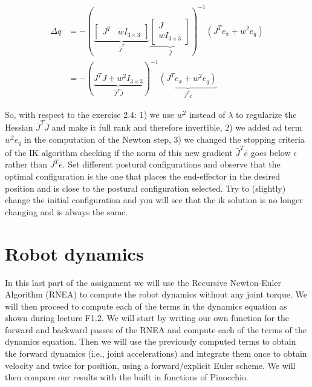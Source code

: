 \documentclass[11pt]{article}
\newcommand{\mat}[1]{\ensuremath{\begin{bmatrix}#1\end{bmatrix}}}	%
\begin{document}
\begin{align*}
\Delta q &= -\left( \underbrace{ \mat { J^T &  wI_{3 \times 3} }}_{\bar{J}^T} \underbrace{ \mat{J  \\ wI_{3 \times 3}}}_{\bar{J}} \right)^{-1} \left(J^T e_x + w^2e_q \right) \\
&= -\left(\underbrace{  J^TJ + w^2I_{3 \times 3}}_{\bar{J}^T\bar{J}} \right)^{-1} \underbrace{ \left(J^T e_x + w^2 e_q \right) }_{\bar{J}^T\bar{e}}
\end{align*}


So, with respect to the exercise 2.4: 1) we use $w^2$ instead of $\lambda $ to regularize the Hessian $\bar{J}^T\bar{J}$ and make it full rank and therefore invertible, 2) we added ad term $w^2 e_q $ in the computation of the Newton step, 3) we changed the stopping criteria of the IK algorithm checking if the norm of this new gradient $\bar{J}^T\bar{e}$ goes below $\epsilon$ rather than  $J^T\bar{e}$.
Set different postural configurations and observe that the optimal configuration is the one that places the end-effector in the desired position and is close to the postural  configuration selected. Try to (slightly) change the initial configuration and you will see that the ik solution is no longer changing and is always the same. 
\\

\section{Robot dynamics}

In this last part of the assignment we will use the Recursive Newton-Euler Algorithm (RNEA) to compute the robot dynamics without any joint torque. We will then proceed to compute each of the terms in the dynamics equation as shown during lecture F1.2.  We will start by writing our own function for the forward and backward passes of the RNEA and compute each of the terms of the dynamics equation. Then we will use the previously computed terms to obtain the forward dynamics (i.e., joint accelerations) and integrate them once to obtain velocity and twice  for position, using a forward/explicit Euler scheme. We will then compare our results with the built in functions of Pinocchio.
\end{document}
